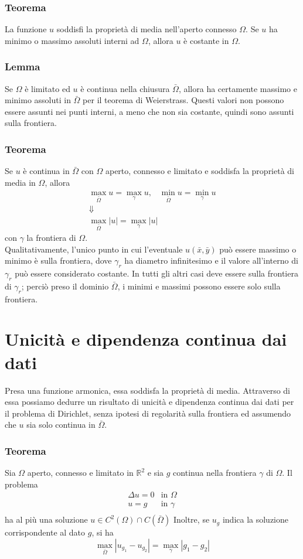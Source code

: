 \subsubsection{Teorema}
La funzione $u$ soddisfi la propriet\`a di media nell'aperto connesso $\Omega$.
Se $u$ ha minimo o massimo assoluti interni ad $\Omega$, allora $u$ \`e costante
in $\Omega$.
\subsubsection{Lemma}
Se $\Omega$ \`e limitato ed $u$ \`e continua nella chiusura $\bar{\Omega}$,
allora ha certamente massimo e minimo assoluti in $\bar{\Omega}$ per il
teorema di Weierstrass. Questi valori non possono essere assunti nei punti
interni, a meno che non sia costante, quindi sono assunti sulla frontiera.

\subsubsection{Teorema}
Se $u$ \`e continua in $\bar{\Omega}$ con $\Omega$ aperto, connesso e limitato
e soddisfa la propriet\`a di media in $\Omega$, allora
\[
	\begin{array}{c}
		\displaystyle{\max_{\bar{\Omega}} u= \max_{\gamma} u, \;\;\;
		\min_{\bar{\Omega}} u= \min_{\gamma} u}\\
		\Downarrow \\
		\displaystyle{\max_{\bar{\Omega}} |u|= \max_{\gamma} |u|}
	\end{array}
\]
con $\gamma$ la frontiera di $\Omega$.\\
Qualitativamente, l'unico punto in cui l'eventuale $u(\bar{x}, \bar{y})$ pu\`o
essere massimo o minimo \`e sulla frontiera, dove $\gamma_r$ ha diametro
infinitesimo e il valore all'interno di $\gamma_r$ pu\`o essere considerato
costante. In tutti gli altri casi deve essere sulla frontiera di $\gamma_r$;
perci\`o preso il dominio $\bar{\Omega}$, i minimi e massimi possono essere solo
sulla frontiera.
\section{Unicit\`a e dipendenza continua dai dati}
Presa una funzione armonica, essa soddisfa la propriet\`a di media.
Attraverso di essa possiamo dedurre un risultato di unicit\`a e dipendenza
continua dai dati per il problema di Dirichlet, senza ipotesi di regolarit\`a
sulla frontiera ed assumendo che $u$ sia solo continua in $\bar{\Omega}$.
\subsubsection{Teorema}
Sia $\Omega$ aperto, connesso e limitato in $\mathbb{R}^2$ e sia $g$ continua
nella frontiera $\gamma$ di $\Omega$.
Il problema
\[
	\begin{array}{ll}
		\Delta u= 0 & \text{in }\Omega \\
		u= g & \text{in }\gamma \\
	\end{array}
\]
ha al pi\`u una soluzione $u \in C^2 (\Omega) \cap C(\bar{\Omega})$
Inoltre, se $u_g$ indica la soluzione corrispondente al dato $g$, si ha
\[
	\max_{\bar{\Omega}} \left| u_{g_1} - u_{g_2} \right|=
	\max_{\gamma} \left| g_1 - g_2 \right|
\]
